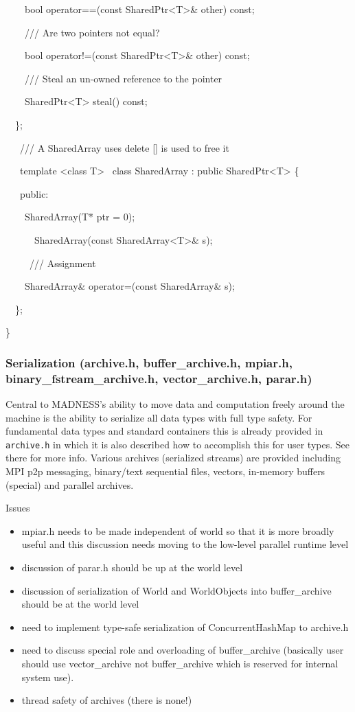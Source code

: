 \documentclass[letterpaper]{article}
\newcommand\liststyleLi{%
\renewcommand\labelitemi{${\bullet}$}
\renewcommand\labelitemii{${\circ}$}
\renewcommand\labelitemiii{${\blacksquare}$}
\renewcommand\labelitemiv{${\bullet}$}
}
\begin{document}
{\ttfamily
\ \ \ \ bool operator==(const SharedPtr{\textless}T{\textgreater}\& other) const;}

{\ttfamily
\ \ \ \ /// Are two pointers not equal?}

{\ttfamily
\ \ \ \ bool operator!=(const SharedPtr{\textless}T{\textgreater}\& other) const;}

{\ttfamily
\ \ \ \ /// Steal an un-owned reference to the pointer }

{\ttfamily
\ \ \ \ SharedPtr{\textless}T{\textgreater} steal() const;}

{\ttfamily
\ \ \};}

{\ttfamily
\ \ \ /// A SharedArray uses delete [] is used to free it}

{\ttfamily
\ \ \ template {\textless}class T{\textgreater} \ class SharedArray : public SharedPtr{\textless}T{\textgreater} \{}

{\ttfamily
\ \ \ public:}

{\ttfamily
\ \ \ \ SharedArray(T* ptr = 0);}

{\ttfamily
\ \ \ \ \ \ SharedArray(const SharedArray{\textless}T{\textgreater}\& s);}

{\ttfamily
\ \ \ \ \ /// Assignment}

{\ttfamily
\ \ \ \ SharedArray\& operator=(const SharedArray\& s);}

{\ttfamily
\ \ \};}

{\ttfamily
\}}

\subsubsection{Serialization (archive.h, buffer\_archive.h, mpiar.h, binary\_fstream\_archive.h, vector\_archive.h, parar.h)}
Central to MADNESS's ability to move data and computation freely around the machine is the ability to serialize all data
types with full type safety. For fundamental data types and standard containers this is already provided in
\texttt{archive.h} in which it is also described how to accomplish this for user types. See there for more info.
Various archives (serialized streams) are provided including MPI p2p messaging, binary/text sequential files, vectors,
in-memory buffers (special) and parallel archives.

Issues

\liststyleLi
\begin{itemize}
\item mpiar.h needs to be made independent of world so that it is more broadly useful and this discussion needs moving
to the low-level parallel runtime level
\item discussion of parar.h should be up at the world level
\item discussion of serialization of World and WorldObjects into buffer\_archive should be at the world level
\item need to implement type-safe serialization of ConcurrentHashMap to archive.h
\item need to discuss special role and overloading of buffer\_archive (basically user should use vector\_archive not buffer\_archive which is reserved
for internal system use).
\item thread safety of archives (there is none!)
\end{itemize}
\end{document}

